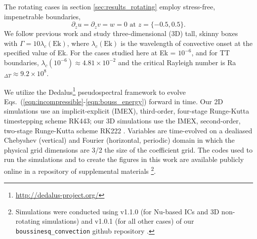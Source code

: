 \documentclass[aps, pre, onecolumn, nofootinbib, notitlepage, groupedaddress, amsfonts, amssymb, amsmath, longbibliography, superscriptaddress]{revtex4-1}
\begin{document}
The rotating cases in section \ref{sec:results_rotating} employ stress-free, impenetrable boundaries,
\begin{equation}
\partial_z u = \partial_z v = w = 0 \, \, \text{at}\,\,z = \{-0.5, 0.5\}.
\label{eqn:vel_bcs}
\end{equation}
We follow previous work  \cite{stellmach&all2014} and study three-dimensional (3D) tall, skinny boxes with $\Gamma = 10\lambda_c(\text{Ek})$, where $\lambda_c(\text{Ek})$ is the wavelength of convective onset at the specified value of Ek. 
For the cases studied here at Ek = $10^{-6}$, and for TT boundaries, $\lambda_c(10^{-6}) \approx 4.81 \times 10^{-2}$ and the critical Rayleigh number is Ra$_{\Delta T} \approx 9.2 \times 10^{8}$.

We utilize the Dedalus\footnote{\url{http://dedalus-project.org/}} pseudospectral framework \cite{burns&all2016, burns&all2020} to evolve Eqs.~(\ref{eqn:incompressible}-\ref{eqn:bouss_energy}) forward in time.
Our 2D simulations use an implicit-explicit (IMEX), third-order, four-stage Runge-Kutta timestepping scheme RK443; our 3D simulations use the IMEX, second-order, two-stage Runge-Kutta scheme RK222 \cite{ascher&all1997}. 
Variables are time-evolved on a dealiased Chebyshev (vertical) and Fourier (horizontal, periodic) domain in which the physical grid dimensions are 3/2 the size of the coefficient grid.  
The codes used to run the simulations and to create the figures in this work are available publicly online in a repository of supplemental materials \cite{anders&all2020a_supp}\footnote{Simulations were conducted using v1.1.0 (for Nu-based ICs and 3D non-rotating simulations) and v1.0.1 (for all other cases) of our \texttt{boussinesq\_convection} github repository \cite{code:boussinesq_convection}.}.
\end{document}
